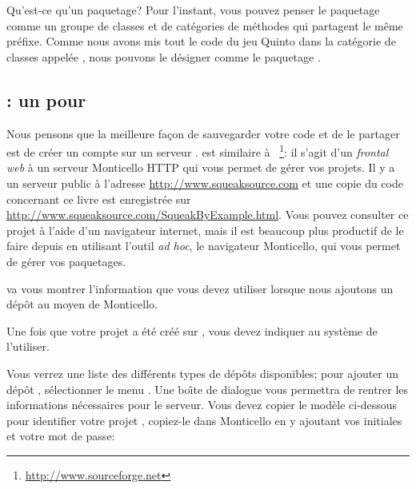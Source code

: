 \documentclass[a4paper,10pt,twoside]{book}
\begin{document}
Qu'est-ce qu'un paquetage? Pour l'instant, vous pouvez penser le paquetage comme un groupe de classes et de catégories de méthodes qui partagent le m\^eme préfixe. Comme nous avons mis tout le code du jeu Quinto dans la catégorie de classes appelée , nous pouvons le désigner comme le paquetage .


\subsection{\ind{\squeaksource}: un  pour \pharo} 
Nous pensons que la meilleure façon de sauvegarder votre code et de le
partager est de créer un compte sur un serveur
\squeaksource. \squeaksource est similaire à
\sourceforge~\footnote{\url{http://www.sourceforge.net}}: il s'agit d'un
\emph{frontal web} à un serveur Monticello HTTP qui vous permet de gérer vos projets.
Il y a un serveur public \squeaksource à l'adresse
\url{http://www.squeaksource.com} et une copie du code concernant ce
livre est enregistrée sur
\url{http://www.squeaksource.com/SqueakByExample.html}. Vous pouvez
consulter ce projet à l'aide d'un navigateur internet, mais il est
beaucoup plus productif de le faire depuis \pharo en utilisant
l'outil \emph{ad hoc}, le navigateur Monticello, qui vous permet de
gérer vos paquetages.

\squeaksource va vous montrer l'information que vous devez utiliser
lorsque nous ajoutons un dépôt au moyen de Monticello.

Une fois que votre projet a été créé sur \squeaksource, vous devez indiquer au système \pharo de l'utiliser.

  Vous
verrez une liste des différents types de dépôts disponibles; pour
ajouter un dépôt \squeaksource, sélectionner le menu . Une
bo\^{\i}te de dialogue vous permettra de rentrer les informations
nécessaires pour le serveur.
Vous devez copier le modèle ci-dessous pour identifier votre projet
\squeaksource, copiez-le dans Monticello en y ajoutant vos initiales
et votre mot de passe:
\end{document}
